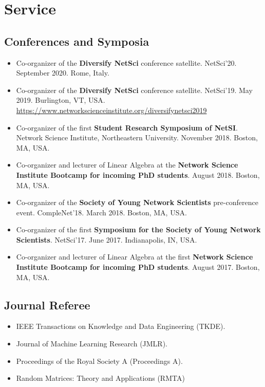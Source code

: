 \documentclass[12pt,]{scrartcl}
\newenvironment{myitemize}
{ \begin{itemize}
    \setlength{\itemsep}{5pt}
    \setlength{\parskip}{0pt}
    \setlength{\parsep}{0pt}     }
{ \end{itemize}                  }
\begin{document}
\section{Service}\label{academic-activities}

\subsection{Conferences and Symposia}\label{conferences}

\begin{myitemize}
\leftskip-0.25in

\item Co-organizer of the \textbf{Diversify NetSci} conference satellite. NetSci'20. September 2020. Rome, Italy.

\item Co-organizer of the \textbf{Diversify NetSci} conference satellite. NetSci'19. May 2019. Burlington, VT, USA. \url{https://www.networkscienceinstitute.org/diversifynetsci2019}

\item Co-organizer of the first \textbf{Student Research Symposium of NetSI}. Network Science Institute, Northeastern University. November 2018. Boston, MA, USA. 

\item Co-organizer and lecturer of Linear Algebra at the \textbf{Network Science Institute Bootcamp for incoming PhD students}. August 2018. Boston, MA, USA.

\item Co-organizer of the \textbf{Society of Young Network Scientists} pre-conference event. CompleNet'18. March 2018. Boston, MA, USA.

\item Co-organizer of the first \textbf{Symposium for the Society of Young Network Scientists}. NetSci'17. June 2017. Indianapolis, IN, USA.

\item Co-organizer and lecturer of Linear Algebra at the first \textbf{Network Science Institute Bootcamp for incoming PhD students}. August 2017. Boston, MA, USA.

\end{myitemize}


\subsection{Journal Referee}\label{journal-referee}

\begin{myitemize}
\leftskip-0.25in

\item IEEE Transactions on Knowledge and Data Engineering (TKDE).

\item Journal of Machine Learning Research (JMLR).

\item Proceedings of the Royal Society A (Proceedings A).

\item Random Matrices: Theory and Applications (RMTA)

\end{myitemize}
\end{document}
